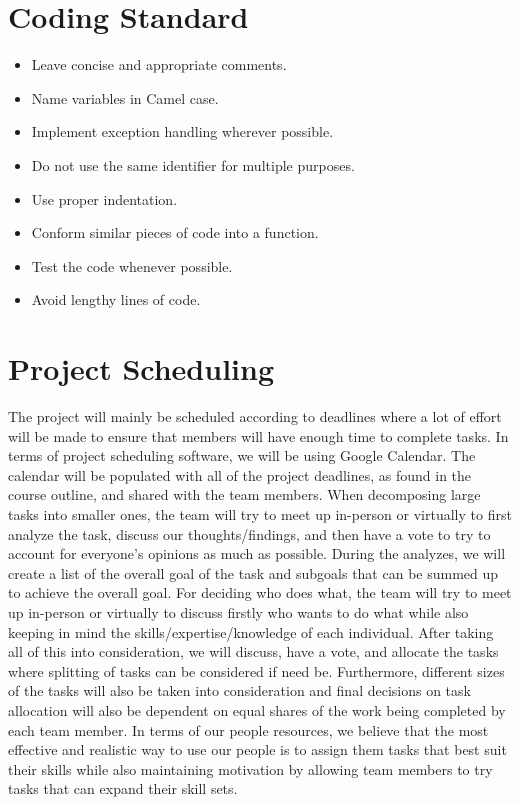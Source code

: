 \documentclass[12pt, titlepage]{article}
\begin{document}
\section{Coding Standard}
\begin{itemize}
	\item Leave concise and appropriate comments.
	\item Name variables in Camel case.
	\item Implement exception handling wherever possible.
	\item Do not use the same identifier for multiple purposes.
	\item Use proper indentation.
	\item Conform similar pieces of code into a function.
	\item Test the code whenever possible.
	\item Avoid lengthy lines of code.
\end{itemize}
\section{Project Scheduling}

The project will mainly be scheduled according to deadlines where a lot of effort
will be made to ensure that members will have enough time to complete tasks.
In terms of project scheduling software, we will be using Google Calendar.
The calendar will be populated with all of the project deadlines, as found in the
course outline, and shared with the team members. When decomposing large
tasks into smaller ones, the team will try to meet up in-person or virtually to
first analyze the task, discuss our thoughts/findings, and then have a vote to try
to account for everyone’s opinions as much as possible. During the analyzes, we
will create a list of the overall goal of the task and subgoals that can be summed
up to achieve the overall goal. For deciding who does what, the team will try to
meet up in-person or virtually to discuss firstly who wants to do what while also
keeping in mind the skills/expertise/knowledge of each individual. After taking
all of this into consideration, we will discuss, have a vote, and allocate the tasks
where splitting of tasks can be considered if need be. Furthermore, different
sizes of the tasks will also be taken into consideration and final decisions on task
allocation will also be dependent on equal shares of the work being completed by
each team member. In terms of our people resources, we believe that the most
effective and realistic way to use our people is to assign them tasks that best
suit their skills while also maintaining motivation by allowing team members to
try tasks that can expand their skill sets.
\end{document}
